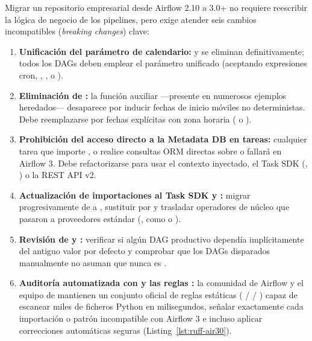 Migrar un repositorio empresarial desde Airflow 2.10 a 3.0+ no requiere reescribir la lógica de negocio de los pipelines, pero exige atender seis cambios incompatibles (\textit{breaking changes}) clave:

\begin{enumerate}
  \item \textbf{Unificación del parámetro de calendario:}  y  se eliminan definitivamente; todos los DAGs deben emplear el parámetro unificado  (aceptando expresiones cron, , ,  o ).
  \item \textbf{Eliminación de :} la función auxiliar  ---presente en numerosos ejemplos heredados--- desaparece por inducir fechas de inicio móviles no deterministas. Debe reemplazarse por fechas explícitas con zona horaria ( o ).
  \item \textbf{Prohibición del acceso directo a la Metadata DB en tareas:} cualquier tarea que importe ,  o realice consultas ORM directas sobre  o  fallará en Airflow 3. Debe refactorizarse para usar el contexto inyectado, el Task SDK (, ) o la REST API v2.
  \item \textbf{Actualización de importaciones al Task SDK y :} migrar progresivamente de  a , sustituir  por  y trasladar operadores de núcleo que pasaron a proveedores estándar (, como  o ).
  \item \textbf{Revisión de  y :} verificar si algún DAG productivo dependía implícitamente del antiguo valor por defecto  y comprobar que los DAGs disparados manualmente no asuman que  nunca es .
  \item \textbf{Auditoría automatizada con  y las reglas :} la comunidad de Airflow y el equipo de  mantienen un conjunto oficial de reglas estáticas ( /  / ) capaz de escanear miles de ficheros Python en milisegundos, señalar exactamente cada importación o patrón incompatible con Airflow 3 e incluso aplicar correcciones automáticas seguras (Listing~\ref{lst:ruff-air30}).
\end{enumerate}

